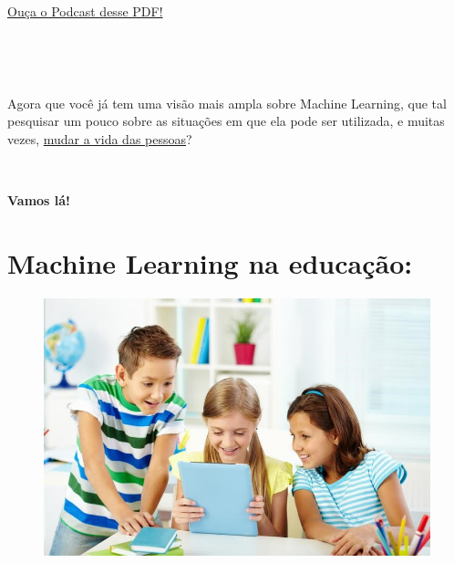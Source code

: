 \documentclass[12pt]{article}
\begin{document}
\begin{tikzpicture}[grow cyclic, text width=2.7cm, align=flush center,
	level 1/.style={level distance=5cm,sibling angle=90},
	level 2/.style={level distance=2.5cm,sibling angle=57}]
    \end{tikzpicture}
    
    
    \
    
    \
    
    \
    
    \
    
    \
    
    \
    
    \
    
    \

    \begin{caixa}

        \begin{center}

            \href{https://soundcloud.com/gustavo-rodrigues-468052117/ldo-machine-learning-capitulo04}{Ouça o Podcast desse PDF!}
            
        \end{center}

    \end{caixa}

    \

    \
    
    \centering Agora que você já tem uma visão mais ampla sobre Machine Learning,
que tal pesquisar um pouco sobre as situações em que ela pode ser
utilizada, e muitas vezes, \href{https://www.deal.com.br/blog/7-maneiras-de-como-a-inteligencia-artificial-esta-mudando-nosso-dia-a-dia/}{mudar a vida das pessoas}?

\

    \centering \Large{\textbf{Vamos lá!}}
    
\large
            \section*{\centering Machine Learning na educação:}\label{sec:ML_Na_Educacao}
            
            \begin{figure}[ht]
            \centering
            \includegraphics[scale=0.6]{ldo-1.jpg}               
            \end{figure}
            
\end{document}
